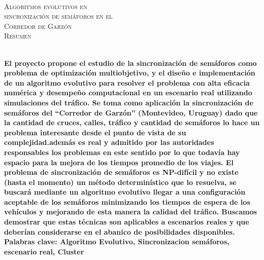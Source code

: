 {
\thispagestyle{empty}
~\\[0.2cm]
\begin{center}
    \textsc{\huge Algoritmos evolutivos en  } \\[0.2cm] 
    \textsc{\huge sincronización de semáforos en el  } \\[0.2cm]         
    \textsc{\huge Corredor de Garzón} \\[1cm]
    \textsc{\Large Resumen}
\end{center}
~\\[0.2cm]
\textbf{\large 
El proyecto propone el estudio de la sincronización de semáforos como problema de optimización multiobjetivo, y el diseño e implementación de un algoritmo evolutivo para resolver el problema con alta eficacia numérica y desempeño computacional en un escenario real utilizando simulaciones del tráfico. \newline \newline
Se toma como aplicación la sincronización de semáforos del “Corredor de Garzón” (Montevideo, Uruguay) dado que la cantidad de cruces, calles, tráfico y cantidad de semáforos lo hace un problema interesante desde el punto de vista de su complejidad.además es real y admitido por las autoridades responsables los problemas en este sentido por lo que todavía hay espacio para la mejora de los tiempos promedio de los viajes.  \newline \newline
El problema de sincronización de semáforos es NP-difícil y no existe (hasta el momento) un método determinístico que lo resuelva, se buscará mediante un algoritmo evolutivo llegar a una configuración aceptable de los semáforos minimizando los tiempos de espera de los vehículos y mejorando de esta manera la calidad del tráfico.
Buscamos demostrar que estas técnicas son aplicables a escenarios reales y que deberían considerarse en el abanico de posibilidades disponibles. } 	
	~\\[1.0cm]
    \textbf{\large Palabras clave: Algoritmo Evolutivo, Sincronizacion semáforos, escenario real, Cluster}

}
\cleardoublepage
